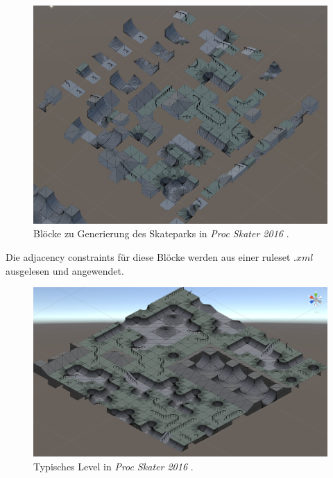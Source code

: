 \documentclass[12pt, a4paper,twoside,openright]{report} %
\begin{document}
\begin{figure}[H]
    \centering
    \includegraphics[width=0.9\linewidth]{images/proc-skater-ruleset.png}%
    \caption{Blöcke zu Generierung des Skateparks in \textit{Proc Skater 2016} \cite{procskater2016}.}%
\end{figure}

Die adjacency constraints für diese Blöcke werden aus einer ruleset $.xml$ ausgelesen und angewendet.

\begin{figure}[H]
    \centering
    \includegraphics[width=0.9\linewidth]{images/proc-skate-level.png}%
    \caption{Typisches Level in \textit{Proc Skater 2016} \cite{procskater2016}.}%
\end{figure}

\pagebreak
\end{document}

